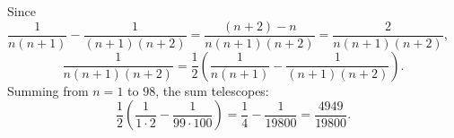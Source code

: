 Since $\dfrac{1}{n(n+1)}-\dfrac{1}{(n+1)(n+2)}=\dfrac{(n+2)-n}{n(n+1)(n+2)}=\dfrac{2}{n(n+1)(n+2)}$,
\[
\dfrac{1}{n(n+1)(n+2)}=\dfrac{1}{2}\left(\dfrac{1}{n(n+1)}-\dfrac{1}{(n+1)(n+2)}\right).
\]
Summing from $n=1$ to $98$, the sum telescopes:
\[
\dfrac{1}{2}\left(\dfrac{1}{1\cdot2}-\dfrac{1}{99\cdot100}\right)=\dfrac{1}{4}-\dfrac{1}{19800}=\boxed{\dfrac{4949}{19800}}.
\]
